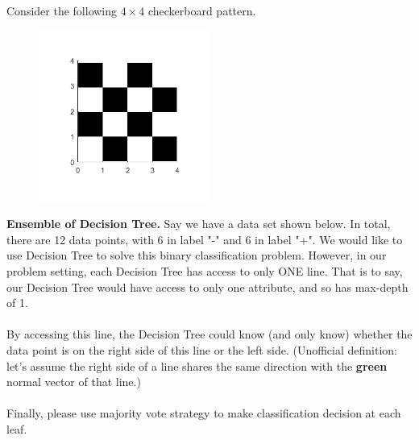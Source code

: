 \documentclass[11pt,addpoints,answers]{exam}
\numberwithin{equation}{section} %
\numberwithin{figure}{section} %
\numberwithin{table}{section} %
\begin{document}
\begin{questions}
    \newpage
    \question[2] Consider the following $4\times 4$ checkerboard pattern. 
    \begin{figure}[H]
        \centering
        \includegraphics[width = 0.5\textwidth]{checkerboard.png}
        \label{Q_2dt}
    \end{figure}
    
    \question[3] \textbf{Ensemble of Decision Tree.} Say we have a data set shown below. In total, there are 12 data points, with 6 in label "-" and 6 in label "+". We would like to use Decision Tree to solve this binary classification problem. However, in our problem setting, each Decision Tree has access to only ONE line. That is to say, our Decision Tree would have access to only one attribute, and so has max-depth of 1. \\ \\
	By accessing this line, the Decision Tree could know (and only know) whether the data point is on the right side of this line or the left side. (Unofficial definition: let's assume the right side of a line shares the same direction with the {\textbf{green}} normal vector of that line.) \\ \\
    Finally, please use majority vote strategy to make classification decision at each leaf.\\
    

\end{questions}
\end{document}
